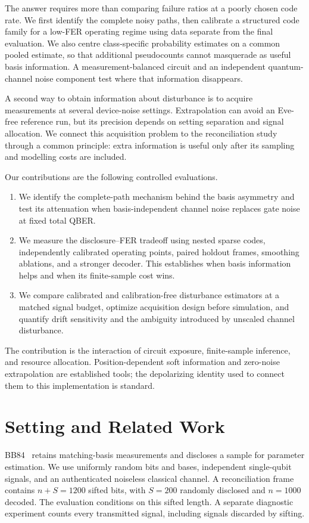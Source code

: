 The answer requires more than comparing failure ratios at a poorly chosen code rate. We
first identify the complete noisy paths, then calibrate a structured code family for a
low-FER operating regime using data separate from the final evaluation. We also centre
class-specific probability estimates on a common pooled estimate, so that additional
pseudocounts cannot masquerade as useful basis information. A measurement-balanced circuit
and an independent quantum-channel noise component test where that information disappears.

A second way to obtain information about disturbance is to acquire measurements at several
device-noise settings. Extrapolation can avoid an Eve-free reference run, but its precision
depends on setting separation and signal allocation. We connect this acquisition problem to
the reconciliation study through a common principle: extra information is useful only after
its sampling and modelling costs are included.

Our contributions are the following controlled evaluations.
\begin{enumerate}
\item We identify the complete-path mechanism behind the basis asymmetry and test its
attenuation when basis-independent channel noise replaces gate noise at fixed total QBER.
\item We measure the disclosure--FER tradeoff using nested sparse codes, independently
calibrated operating points, paired holdout frames, smoothing ablations, and a stronger
decoder. This establishes when basis information helps and when its finite-sample cost wins.
\item We compare calibrated and calibration-free disturbance estimators at a matched signal
budget, optimize acquisition design before simulation, and quantify drift sensitivity and
the ambiguity introduced by unscaled channel disturbance.
\end{enumerate}
The contribution is the interaction of circuit exposure, finite-sample inference, and
resource allocation. Position-dependent soft information and zero-noise extrapolation are
established tools; the depolarizing identity used to connect them to this implementation is
standard.

\section{Setting and Related Work}
\label{sec:setting}
BB84~\cite{bennett1984} retains matching-basis measurements and discloses a sample for parameter
estimation. We use uniformly random bits and bases, independent single-qubit signals, and an
authenticated noiseless classical channel. A reconciliation frame contains $n+S=1200$ sifted
bits, with $S=200$ randomly disclosed and $n=1000$ decoded. The evaluation conditions on this
sifted length. A separate diagnostic experiment counts every transmitted signal, including
signals discarded by sifting.


